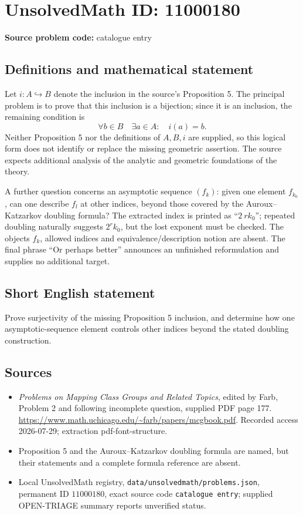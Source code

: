 \documentclass[11pt]{article}
\begin{document}
\section*{UnsolvedMath ID: 11000180}
\textbf{Source problem code:} catalogue entry
\subsection{Definitions and mathematical statement}
Let \(i:A\hookrightarrow B\) denote the inclusion in the source's Proposition 5. The principal problem is to prove that this inclusion is a bijection; since it is an inclusion, the remaining condition is
\[
 \forall b\in B\quad\exists a\in A:\quad i(a)=b.
\]
Neither Proposition 5 nor the definitions of \(A,B,i\) are supplied, so this logical form does not identify or replace the missing geometric assertion. The source expects additional analysis of the analytic and geometric foundations of the theory.

A further question concerns an asymptotic sequence \((f_k)\): given one element \(f_{k_0}\), can one describe \(f_l\) at other indices, beyond those covered by the Auroux--Katzarkov doubling formula? The extracted index is printed as ``\(2\ r k_0\)''; repeated doubling naturally suggests \(2^rk_0\), but the lost exponent must be checked. The objects \(f_k\), allowed indices and equivalence/description notion are absent. The final phrase ``Or perhaps better'' announces an unfinished reformulation and supplies no additional target.
\subsection{Short English statement}
Prove surjectivity of the missing Proposition 5 inclusion, and determine how one asymptotic-sequence element controls other indices beyond the stated doubling construction.
\subsection{Sources}
\begin{itemize}
\item \emph{Problems on Mapping Class Groups and Related Topics}, edited by Farb, Problem 2 and following incomplete question, supplied PDF page 177. \url{https://www.math.uchicago.edu/~farb/papers/mcgbook.pdf}. Recorded access 2026-07-29; extraction pdf-font-structure.
\item Proposition 5 and the Auroux--Katzarkov doubling formula are named, but their statements and a complete formula reference are absent.
\item Local UnsolvedMath registry, \texttt{data/unsolvedmath/problems.json}, permanent ID \(11000180\), exact source code \texttt{catalogue entry}; supplied OPEN-TRIAGE summary reports unverified status.
\end{itemize}
\end{document}
